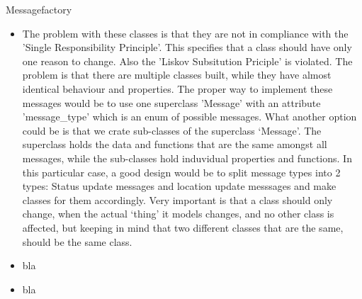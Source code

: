 \documentclass[12pt]{article}
\begin{document}
Messagefactory

\begin{itemize}
\item The problem with these classes is that they are not in compliance with the 'Single Responsibility Principle'. This specifies that a class should have only one reason to change. Also the 'Liskov Subsitution Priciple'  is violated. The problem is that there are multiple classes built, while they have almost identical behaviour and properties. The proper way to implement these messages would be to use one superclass 'Message' with an attribute 'message\_type' which is an enum of possible messages. What another option could be is that we crate sub-classes of the superclass `Message'. The superclass holds the data and functions that are the same amongst all messages, while the sub-classes hold induvidual properties and functions. 
In this particular case, a good design would be to split message types into 2 types: Status update messages and location update messsages and make classes for them accordingly. Very important is that a class should only change, when the actual `thing' it models changes, and no other class is affected, but keeping in mind that two different classes that are the same, should be the same class.
\item bla
\item bla
\end{itemize}
\end{document}
